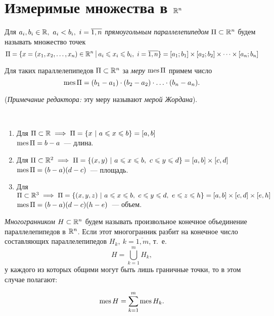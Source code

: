 \documentclass[../../main.tex]{subfiles}
\begin{document}
\section{Измеримые множества в $\mathbb{R}^n$}

Для $a_i, b_i \in \mathbb{R},\ a_i < b_i,\ i = \overline{1,n}$ 
\emph{прямоугольным параллелепипедом}
$\Pi \subset \mathbb{R}^n$ будем называть множество точек
\[
	\Pi = \{x = (x_1, x_2, \ldots, x_n) \in \R^n\ \vline\ 
	a_i \le x_i \le b_i,\ i =
	 \overline{1,n}\} = [a_1; b_1] \times [a_2; b_2] 
	 \times \dots \times [a_n; b_n]
\]

Для таких параллелепипедов $\Pi\subset \mathbb{R}^n$ за 
\emph{меру} $\operatorname{mes}\Pi$ примем число
\begin{equation}
\label{611}
\operatorname{mes}\Pi = (b_1 - a_1) \cdot (b_2 - a_2) \cdot \ldots \cdot (b_n - a_n).
\end{equation}

(\emph{Примечание редактора:} эту меру называют \emph{мерой Жордана}).

\begin{example}
    ~
    
	\begin{enumerate}
		\item Для $\Pi \subset \R \implies \Pi = \{x\ |\ 
		a \le x \le b \} = [a, b] $\\
		$\operatorname{mes}\Pi = b - a$~--- длина. 
		\item Для $\Pi \subset \mathbb{R}^2 \implies \Pi = 
		\{(x,y)\ |\ a \leqslant x \leqslant b,\ c \leqslant y \leqslant d \} = [a, b] \times [c, d]$\\
		$\operatorname{mes} \Pi = (b - a)(d - c)$~--- площадь. 
		\item Для $\Pi \subset \mathbb{R}^3 \implies \Pi = 
		\{(x,y,z)\ |\ a \leqslant x \leqslant b,\ c \leqslant y \leqslant d,\ e \leqslant z \leqslant h \} = 
		[a, b] \times [c, d] \times [e, h] $\\
		$\operatorname{mes}\Pi = (b - a)(d - c)(h - e)$~--- объем. 
	\end{enumerate}
\end{example}

\emph{Многогранником} $H \subset \mathbb{R}^n$ будем называть произвольное 
конечное объединение параллелепипедов в $\mathbb{R}^n$.
Если этот многогранник разбит на конечное число  составляющих параллелепипедов 
$H_k,\ k = \overline{1,m}$, т.~е.
\[H = \bigcup\limits_{k=1}^m H_k,\]
у каждого из которых общими могут быть лишь
граничные точки, то в этом случае полагают:

\begin{equation}
\label{mes_sum}
\operatorname{mes} H = \sum\limits_{k=1}^{m}  \operatorname{mes} H_k.
\end{equation}
\end{document}
